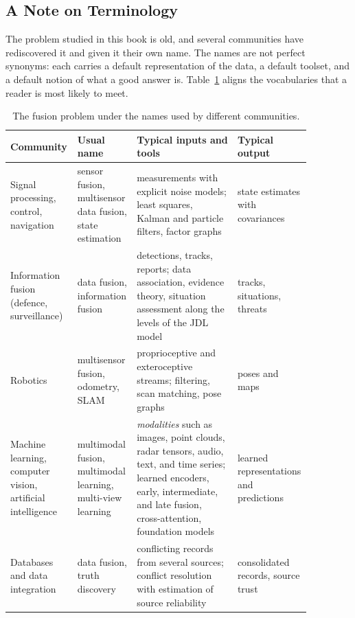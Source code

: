 \begin{addedblock}
\subsection{A Note on Terminology}
\label{subsec:terminology}

The problem studied in this book is old, and several communities have rediscovered it and given it their own name. The names are not perfect synonyms: each carries a default representation of the data, a default toolset, and a default notion of what a good answer is. Table~\ref{tab:fusion-terminology} aligns the vocabularies that a reader is most likely to meet.

\begin{table}[!t]
    \centering
    \footnotesize
    \setlength{\tabcolsep}{4pt}
    \caption{The fusion problem under the names used by different communities.}
    \label{tab:fusion-terminology}
    \begin{tabular}{>{\raggedright\arraybackslash}p{0.17\linewidth} >{\raggedright\arraybackslash}p{0.19\linewidth} >{\raggedright\arraybackslash}p{0.33\linewidth} >{\raggedright\arraybackslash}p{0.18\linewidth}}
        \hline
        \textbf{Community} & \textbf{Usual name} & \textbf{Typical inputs and tools} & \textbf{Typical output} \\
        \hline
        Signal processing, control, navigation & sensor fusion, multisensor data fusion, state estimation & measurements with explicit noise models; least squares, Kalman and particle filters, factor graphs \cite{barshalom2001_estimation,sarkka2013_bayesian} & state estimates with covariances \\
        Information fusion (defence, surveillance) & data fusion, information fusion & detections, tracks, reports; data association, evidence theory, situation assessment along the levels of the JDL model \cite{hall_introduction_1997,steinberg1999_jdl,liggins_handbook_2009} & tracks, situations, threats \\
        Robotics & multisensor fusion, odometry, SLAM & proprioceptive and exteroceptive streams; filtering, scan matching, pose graphs \cite{thrun_probabilistic_2005} & poses and maps \\
        Machine learning, computer vision, artificial intelligence & multimodal fusion, multimodal learning, multi-view learning & \emph{modalities} such as images, point clouds, radar tensors, audio, text, and time series; learned encoders, early, intermediate, and late fusion, cross-attention, foundation models \cite{atrey_multimodal_2010,baltrusaitis_multimodal_2019,gao_survey_2020} & learned representations and predictions \\
        Databases and data integration & data fusion, truth discovery & conflicting records from several sources; conflict resolution with estimation of source reliability \cite{bleiholder2009_datafusion,li2016_truthdiscovery} & consolidated records, source trust \\
        \hline
    \end{tabular}
\end{table}


\end{addedblock}
